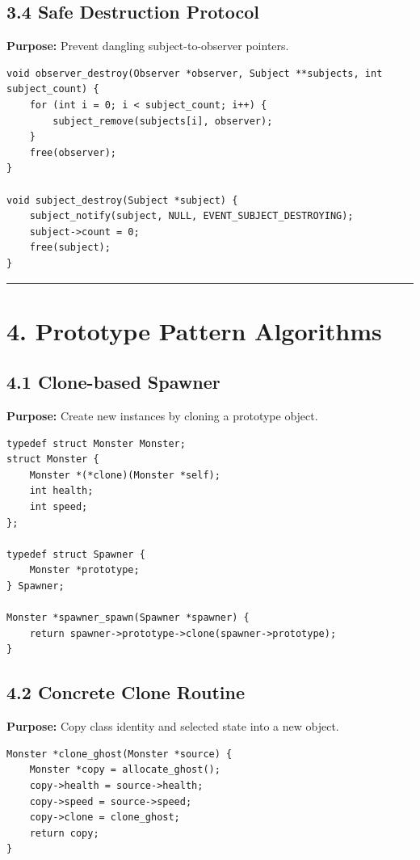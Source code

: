 \documentclass[10pt,letterpaper]{article}
\begin{document}
\subsection{3.4 Safe Destruction Protocol}

\textbf{Purpose:} Prevent dangling subject-to-observer pointers.

\begin{verbatim}
void observer_destroy(Observer *observer, Subject **subjects, int subject_count) {
    for (int i = 0; i < subject_count; i++) {
        subject_remove(subjects[i], observer);
    }
    free(observer);
}

void subject_destroy(Subject *subject) {
    subject_notify(subject, NULL, EVENT_SUBJECT_DESTROYING);
    subject->count = 0;
    free(subject);
}
\end{verbatim}

\medskip\hrule\medskip

\clearpage
\section{4. Prototype Pattern Algorithms}

\subsection{4.1 Clone-based Spawner}

\textbf{Purpose:} Create new instances by cloning a prototype object.

\begin{verbatim}
typedef struct Monster Monster;
struct Monster {
    Monster *(*clone)(Monster *self);
    int health;
    int speed;
};

typedef struct Spawner {
    Monster *prototype;
} Spawner;

Monster *spawner_spawn(Spawner *spawner) {
    return spawner->prototype->clone(spawner->prototype);
}
\end{verbatim}

\subsection{4.2 Concrete Clone Routine}

\textbf{Purpose:} Copy class identity and selected state into a new object.

\begin{verbatim}
Monster *clone_ghost(Monster *source) {
    Monster *copy = allocate_ghost();
    copy->health = source->health;
    copy->speed = source->speed;
    copy->clone = clone_ghost;
    return copy;
}
\end{verbatim}
\end{document}
